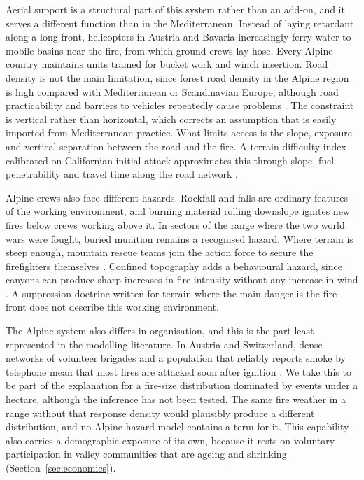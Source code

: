 \documentclass[11pt,a4paper]{article}
\begin{document}
Aerial support is a structural part of this system rather than an add-on, and it serves a different function than in the Mediterranean. Instead of laying retardant along a long front, helicopters in Austria and Bavaria increasingly ferry water to mobile basins near the fire, from which ground crews lay hose. Every Alpine country maintains units trained for bucket work and winch insertion. Road density is not the main limitation, since forest road density in the Alpine region is high compared with Mediterranean or Scandinavian Europe, although road practicability and barriers to vehicles repeatedly cause problems \citep{muller_forest_2020}. The constraint is vertical rather than horizontal, which corrects an assumption that is easily imported from Mediterranean practice. What limits access is the slope, exposure and vertical separation between the road and the fire. A terrain difficulty index calibrated on Californian initial attack approximates this through slope, fuel penetrability and travel time along the road network \citep{cardil_assessing_2025}.

Alpine crews also face different hazards. Rockfall and falls are ordinary features of the working environment, and burning material rolling downslope ignites new fires below crews working above it. In sectors of the range where the two world wars were fought, buried munition remains a recognised hazard. Where terrain is steep enough, mountain rescue teams join the action force to secure the firefighters themselves \citep{muller_forest_2020}. Confined topography adds a behavioural hazard, since canyons can produce sharp increases in fire intensity without any increase in wind \citep{muller_forest_2020, hayajneh_wind_2026}. A suppression doctrine written for terrain where the main danger is the fire front does not describe this working environment.

The Alpine system also differs in organisation, and this is the part least represented in the modelling literature. In Austria and Switzerland, dense networks of volunteer brigades and a population that reliably reports smoke by telephone mean that most fires are attacked soon after ignition \citep{muller_forest_2020}. We take this to be part of the explanation for a fire-size distribution dominated by events under a hectare, although the inference has not been tested. The same fire weather in a range without that response density would plausibly produce a different distribution, and no Alpine hazard model contains a term for it. This capability also carries a demographic exposure of its own, because it rests on voluntary participation in valley communities that are ageing and shrinking (Section~\ref{sec:economics}).
\end{document}
